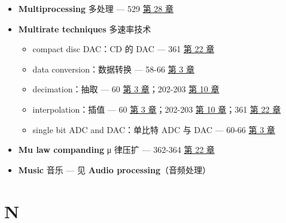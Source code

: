 \begin{itemize}
  \begin{itemize}
  \tightlist
  \item
    amplitude modulation：幅度调制 --- 见 \textbf{Amplitude
    modulation}（幅度调制（调幅））
  \item
    frequency domain signals：频域信号 --- 180-181 
    \hyperref[ch-09]{第 9 章}；312-316  \hyperref[ch-18]{第 18
    章}
  \item
    image formation model：图像形成模型 --- 378 
    \hyperref[ch-23]{第 23 章}；407-410  \hyperref[ch-24]{第
    24 章}
  \item
    of time domain signals：时域信号的乘法 --- 97 
    \hyperref[ch-05]{第 5 章}
  \end{itemize}
\item
  \textbf{Multiprocessing} 多处理 --- 529  \hyperref[ch-28]{第
  28 章}
\item
  \textbf{Multirate techniques} 多速率技术

  \begin{itemize}
  \tightlist
  \item
    compact disc DAC：CD 的 DAC --- 361  \hyperref[ch-22]{第
    22 章}
  \item
    data conversion：数据转换 --- 58-66  \hyperref[ch-03]{第 3
    章}
  \item
    decimation：抽取 --- 60  \hyperref[ch-03]{第 3
    章}；202-203  \hyperref[ch-10]{第 10 章}
  \item
    interpolation：插值 --- 60  \hyperref[ch-03]{第 3
    章}；202-203  \hyperref[ch-10]{第 10 章}；361 
    \hyperref[ch-22]{第 22 章}
  \item
    single bit ADC and DAC：单比特 ADC 与 DAC --- 60-66 
    \hyperref[ch-03]{第 3 章}
  \end{itemize}
\item
  \textbf{Mu law companding} μ 律压扩 --- 362-364 
  \hyperref[ch-22]{第 22 章}
\item
  \textbf{Music} 音乐 --- 见 \textbf{Audio processing}（音频处理）
\end{itemize}

\section{N}

